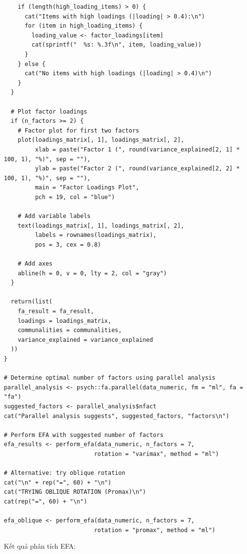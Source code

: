 \begin{lstlisting}
    if (length(high_loading_items) > 0) {
      cat("Items with high loadings (|loading| > 0.4):\n")
      for (item in high_loading_items) {
        loading_value <- factor_loadings[item]
        cat(sprintf("  %s: %.3f\n", item, loading_value))
      }
    } else {
      cat("No items with high loadings (|loading| > 0.4)\n")
    }
  }
  
  # Plot factor loadings
  if (n_factors >= 2) {
    # Factor plot for first two factors
    plot(loadings_matrix[, 1], loadings_matrix[, 2],
         xlab = paste("Factor 1 (", round(variance_explained[2, 1] * 100, 1), "%)", sep = ""),
         ylab = paste("Factor 2 (", round(variance_explained[2, 2] * 100, 1), "%)", sep = ""),
         main = "Factor Loadings Plot",
         pch = 19, col = "blue")
    
    # Add variable labels
    text(loadings_matrix[, 1], loadings_matrix[, 2], 
         labels = rownames(loadings_matrix), 
         pos = 3, cex = 0.8)
    
    # Add axes
    abline(h = 0, v = 0, lty = 2, col = "gray")
  }
  
  return(list(
    fa_result = fa_result,
    loadings = loadings_matrix,
    communalities = communalities,
    variance_explained = variance_explained
  ))
}

# Determine optimal number of factors using parallel analysis
parallel_analysis <- psych::fa.parallel(data_numeric, fm = "ml", fa = "fa")
suggested_factors <- parallel_analysis$nfact
cat("Parallel analysis suggests", suggested_factors, "factors\n")

# Perform EFA with suggested number of factors
efa_results <- perform_efa(data_numeric, n_factors = 7, 
                          rotation = "varimax", method = "ml")

# Alternative: try oblique rotation
cat("\n" + rep("=", 60) + "\n")
cat("TRYING OBLIQUE ROTATION (Promax)\n")
cat(rep("=", 60) + "\n")

efa_oblique <- perform_efa(data_numeric, n_factors = 7, 
                          rotation = "promax", method = "ml")
\end{lstlisting}

Kết quả phân tích EFA:


